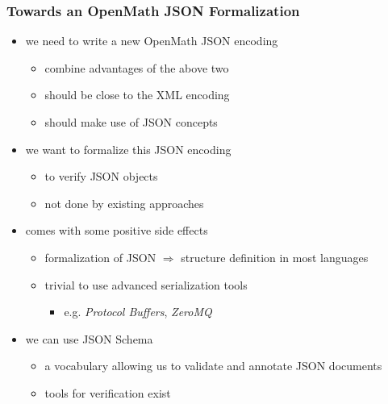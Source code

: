 \documentclass[usenames,dvipsnames]{beamer}
\begin{document}
\begin{frame}
    \frametitle{Towards an OpenMath JSON Formalization}
    \begin{itemize}
        \item we need to write a new OpenMath JSON encoding
        \begin{itemize}
            \item combine advantages of the above two
            \item should be close to the XML encoding
            \item should make use of JSON concepts
        \end{itemize}
        \item we want to formalize this JSON encoding
        \begin{itemize}
            \item to verify JSON objects
            \item not done by existing approaches
        \end{itemize}
        \item comes with some positive side effects
        \begin{itemize}
            \item formalization of JSON $\Rightarrow$ structure definition in most languages
            \item trivial to use advanced serialization tools
            \begin{itemize}
                \item e.g. \textit{Protocol Buffers}, \textit{ZeroMQ}
            \end{itemize}
        \end{itemize}
        \item we can use JSON Schema%
        \begin{itemize}
            \item a vocabulary allowing us to validate and annotate JSON documents
            \item tools for verification exist
        \end{itemize}
    \end{itemize}
\end{frame}
\end{document}
